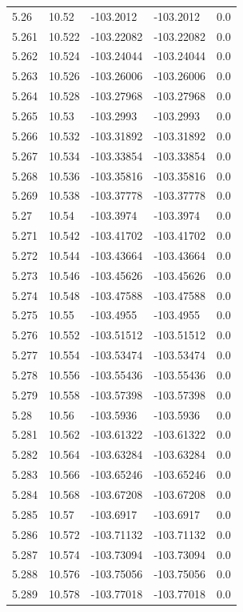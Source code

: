\begin{tabular}{lllll}
5.26 & 10.52 & -103.2012 & -103.2012 & 0.0 \\
5.261 & 10.522 & -103.22082 & -103.22082 & 0.0 \\
5.262 & 10.524 & -103.24044 & -103.24044 & 0.0 \\
5.263 & 10.526 & -103.26006 & -103.26006 & 0.0 \\
5.264 & 10.528 & -103.27968 & -103.27968 & 0.0 \\
5.265 & 10.53 & -103.2993 & -103.2993 & 0.0 \\
5.266 & 10.532 & -103.31892 & -103.31892 & 0.0 \\
5.267 & 10.534 & -103.33854 & -103.33854 & 0.0 \\
5.268 & 10.536 & -103.35816 & -103.35816 & 0.0 \\
5.269 & 10.538 & -103.37778 & -103.37778 & 0.0 \\
5.27 & 10.54 & -103.3974 & -103.3974 & 0.0 \\
5.271 & 10.542 & -103.41702 & -103.41702 & 0.0 \\
5.272 & 10.544 & -103.43664 & -103.43664 & 0.0 \\
5.273 & 10.546 & -103.45626 & -103.45626 & 0.0 \\
5.274 & 10.548 & -103.47588 & -103.47588 & 0.0 \\
5.275 & 10.55 & -103.4955 & -103.4955 & 0.0 \\
5.276 & 10.552 & -103.51512 & -103.51512 & 0.0 \\
5.277 & 10.554 & -103.53474 & -103.53474 & 0.0 \\
5.278 & 10.556 & -103.55436 & -103.55436 & 0.0 \\
5.279 & 10.558 & -103.57398 & -103.57398 & 0.0 \\
5.28 & 10.56 & -103.5936 & -103.5936 & 0.0 \\
5.281 & 10.562 & -103.61322 & -103.61322 & 0.0 \\
5.282 & 10.564 & -103.63284 & -103.63284 & 0.0 \\
5.283 & 10.566 & -103.65246 & -103.65246 & 0.0 \\
5.284 & 10.568 & -103.67208 & -103.67208 & 0.0 \\
5.285 & 10.57 & -103.6917 & -103.6917 & 0.0 \\
5.286 & 10.572 & -103.71132 & -103.71132 & 0.0 \\
5.287 & 10.574 & -103.73094 & -103.73094 & 0.0 \\
5.288 & 10.576 & -103.75056 & -103.75056 & 0.0 \\
5.289 & 10.578 & -103.77018 & -103.77018 & 0.0 \\

\end{tabular}
